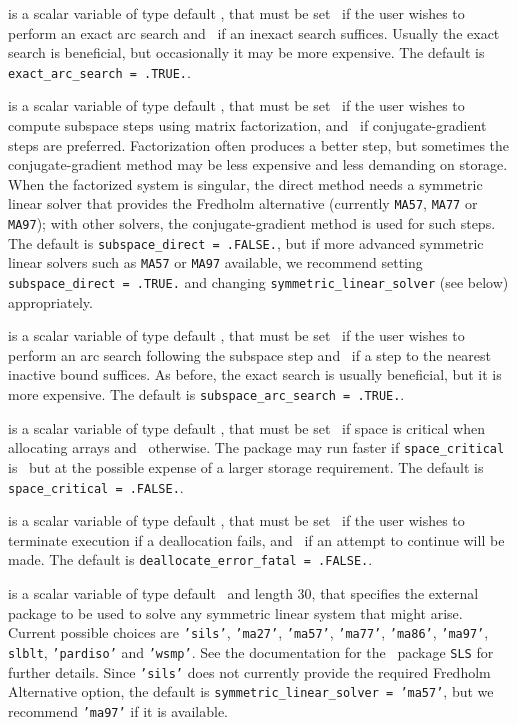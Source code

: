 \begin{description}
 is a scalar variable of type default \logical, that
must be set \true\ if the user wishes to perform an exact arc search
and \false\ if an inexact search suffices. Usually the exact search is
beneficial, but occasionally it may be more expensive.
The default is {\tt exact\_arc\_search = .TRUE.}.

 is a scalar variable of type default \logical, that
must be set \true\ if the user wishes to compute subspace steps using
matrix factorization,
and \false\ if conjugate-gradient steps are preferred. Factorization
often produces a better step, but sometimes the conjugate-gradient method
may be less expensive and less demanding on storage.
When the factorized system is singular, the direct method needs a
symmetric linear solver that provides the Fredholm alternative (currently
{\tt MA57}, {\tt MA77} or {\tt MA97}); with other solvers, the
conjugate-gradient method is used for such steps.
The default is {\tt subspace\_direct = .FALSE.}, but if more advanced
symmetric linear solvers such as {\tt MA57} or {\tt MA97} available,
we recommend setting {\tt subspace\_direct = .TRUE.} and changing
{\tt symmetric\_linear\_solver} (see below) appropriately.

 is a scalar variable of type default \logical, that
must be set \true\ if the user wishes to perform an arc search following
the subspace step and \false\ if a step to the nearest inactive bound suffices.
As before, the exact search is usually beneficial, but it is more expensive.
The default is {\tt subspace\_arc\_search = .TRUE.}.

 is a scalar variable of type default \logical,
that must be set \true\ if space is critical when allocating arrays
and  \false\ otherwise. The package may run faster if
{\tt space\_critical} is \false\ but at the possible expense of a larger
storage requirement. The default is {\tt space\_critical = .FALSE.}.

 is a scalar variable of type default \logical,
that must be set \true\ if the user wishes to terminate execution if
a deallocation  fails, and \false\ if an attempt to continue
will be made. The default is {\tt deallocate\_error\_fatal = .FALSE.}.

 is a scalar variable of type default \character\
and length 30, that specifies the external package to be used to
solve any symmetric linear system that might arise. Current possible
choices are {\tt 'sils'}, {\tt 'ma27'}, {\tt 'ma57'}, {\tt 'ma77'},
{\tt 'ma86'}, {\tt 'ma97'}, {\tt slblt}, {\tt 'pardiso'}
and {\tt 'wsmp'}.
See the documentation for the \galahad\ package {\tt SLS} for further details.
Since  {\tt 'sils'} does not currently provide the required Fredholm
Alternative option, the default is {\tt symmetric\_linear\_solver = 'ma57'},
but we recommend {\tt 'ma97'} if it is available.


\end{description}
